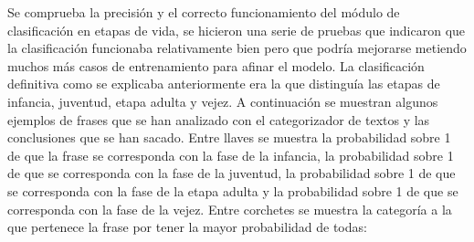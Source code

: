 Se comprueba la precisión y el correcto funcionamiento del módulo de clasificación en etapas de vida, se hicieron una serie de pruebas que indicaron que la clasificación funcionaba relativamente bien pero que podría mejorarse metiendo muchos más casos de entrenamiento para afinar el modelo. La clasificación definitiva como se explicaba anteriormente era la que distinguía las etapas de infancia, juventud, etapa adulta y vejez. A continuación se muestran algunos ejemplos de frases que se han analizado con el categorizador de textos y las conclusiones que se han sacado. Entre llaves se muestra la probabilidad sobre 1 de que la frase se corresponda con la fase de la infancia, la probabilidad sobre 1 de que se corresponda con la fase de la juventud, la probabilidad sobre 1 de que se corresponda con la fase de la etapa adulta y la probabilidad sobre 1 de que se corresponda con la fase de la vejez. Entre corchetes se muestra la categoría a la que pertenece la frase por tener la mayor probabilidad de todas:

